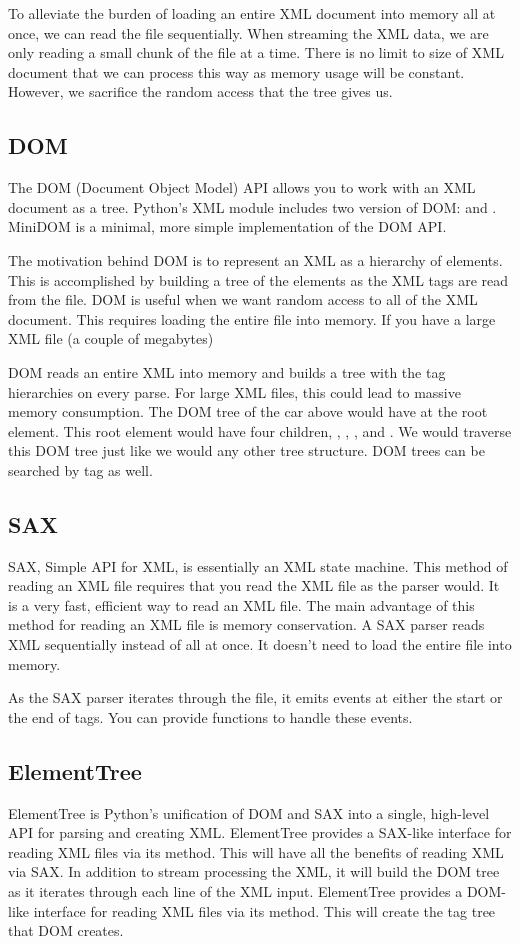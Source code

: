 To alleviate the burden of loading an entire XML document into memory all at once, we can read the file sequentially.
When streaming the XML data, we are only reading a small chunk of the file at a time.
There is no limit to size of XML document that we can process this way as memory usage will be constant.
However, we sacrifice the random access that the tree gives us.

\subsection*{DOM}
The DOM (Document Object Model) API allows you to work with an XML document as a tree.
Python's XML module includes two version of DOM:  and .
MiniDOM is a minimal, more simple implementation of the DOM API.

The motivation behind DOM is to represent an XML as a hierarchy of elements.
This is accomplished by building a tree of the elements as the XML tags are read from the file.
DOM is useful when we want random access to all of the XML document.
This requires loading the entire file into memory.
If you have a large XML file (a couple of megabytes)

DOM reads an entire XML into memory and builds a tree with the tag hierarchies on every parse.
For large XML files, this could lead to massive memory consumption.
The DOM tree of the car above would have  at the root element.
This root element would have four children, , , , and .
We would traverse this DOM tree just like we would any other tree structure.
DOM trees can be searched by tag as well.

\subsection*{SAX}
SAX, Simple API for XML, is essentially an XML state machine.
This method of reading an XML file requires that you read the XML file as the parser would.
It is a very fast, efficient way to read an XML file.
The main advantage of this method for reading an XML file is memory conservation.
A SAX parser reads XML sequentially instead of all at once.
It doesn't need to load the entire file into memory.

As the SAX parser iterates through the file, it emits events at either the start or the end of tags.
You can provide functions to handle these events.


\subsection*{ElementTree}
ElementTree is Python's unification of DOM and SAX into a single, high-level API for parsing and creating XML.
ElementTree provides a SAX-like interface for reading XML files via its  method.
This will have all the benefits of reading XML via SAX.
In addition to stream processing the XML, it will build the DOM tree as it iterates through each line of the XML input.
ElementTree provides a DOM-like interface for reading XML files via its  method.
This will create the tag tree that DOM creates.

